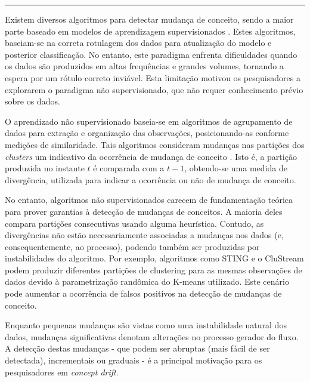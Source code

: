 \documentclass[qual, classic, a4paper]{ufbathesis}
\begin{document}
\vspace{1cm}
\hrule
\vspace{1cm}

 
Existem diversos algoritmos para detectar mudança de conceito, sendo a maior parte baseado em modelos de aprendizagem supervisionados \cite{Gama:2014:SCD:2597757.2523813}. 
Estes algoritmos, baseiam-se na correta rotulagem dos dados para atualização do modelo e posterior classificação. No entanto, este paradigma enfrenta dificuldades quando os dados são produzidos em altas frequências e grandes volumes, tornando a espera por um rótulo correto inviável.
Esta limitação motivou os pesquisadores a explorarem o paradigma não supervisionado, que não requer conhecimento prévio sobre os dados.

O aprendizado não supervisionado baseia-se em algoritmos de agrupamento de dados para extração e organização das observações, posicionando-as conforme medições de similaridade. Tais algoritmos consideram mudanças nas partições dos \textit{clusters} um indicativo da ocorrência de mudança de conceito \cite{Aggarwal:2003:FCE:1315451.1315460}.
Isto é, a partição produzida no instante $t$ é comparada com a $t - 1$, obtendo-se uma medida de divergência, utilizada para indicar a ocorrência ou não de mudança de conceito. 

No entanto, algoritmos não supervisionados carecem de fundamentação teórica para prover garantias à detecção de mudanças de conceitos. A maioria deles compara partições consecutivas usando alguma heurística. Contudo, as divergências não estão necessariamente associadas a mudanças nos dados (e, consequentemente, ao processo), podendo também ser produzidas por instabilidades do algoritmo. Por exemplo, algoritmos como STING \cite{Wang:1997:SSI:645923.758369} e o CluStream \cite{Aggarwal:2003:FCE:1315451.1315460} podem produzir diferentes partições de clustering para as mesmas observações de dados devido à parametrização randômica do K-means utilizado. Este cenário pode aumentar a ocorrência de falsos positivos na detecção de mudanças de conceito. 

Enquanto pequenas mudanças são vistas como uma instabilidade natural dos dados, mudanças significativas denotam alterações no processo gerador do fluxo. A detecção destas mudanças - que podem ser abruptas (mais fácil de ser detectada), incrementais ou graduais \cite{Tsymbal04theproblem} - é a principal motivação para os pesquisadores em \textit{concept drift}.
\end{document}
